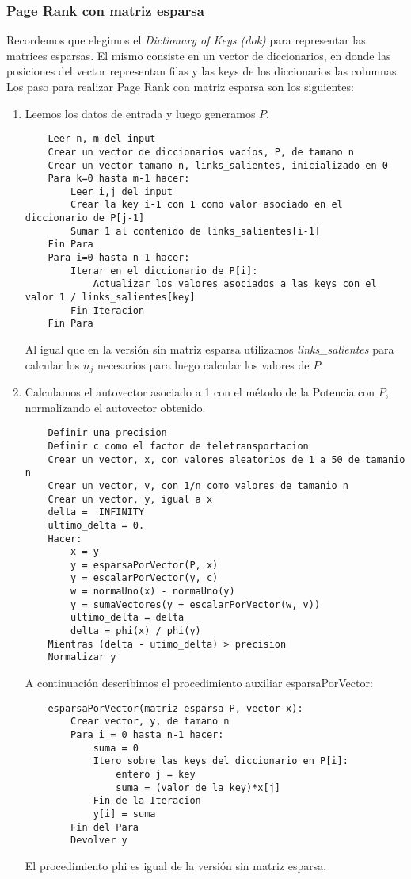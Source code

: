 \subsubsection{Page Rank con matriz esparsa}\label{imp_esparsa}
Recordemos que elegimos el \textit{Dictionary of Keys (dok)} para representar las matrices esparsas. El mismo consiste en un vector de diccionarios, en donde las posiciones del vector representan filas y las keys de los diccionarios las columnas.
Los paso para realizar Page Rank con matriz esparsa son los siguientes:
\begin{enumerate}
	\item Leemos los datos de entrada y luego generamos $P$.
	\begin{lstlisting}
	Leer n, m del input
	Crear un vector de diccionarios vacíos, P, de tamano n
	Crear un vector tamano n, links_salientes, inicializado en 0
	Para k=0 hasta m-1 hacer:
		Leer i,j del input
		Crear la key i-1 con 1 como valor asociado en el diccionario de P[j-1]
		Sumar 1 al contenido de links_salientes[i-1]
	Fin Para
	Para i=0 hasta n-1 hacer:
		Iterar en el diccionario de P[i]:
			Actualizar los valores asociados a las keys con el valor 1 / links_salientes[key]
		Fin Iteracion
	Fin Para
	\end{lstlisting}
	Al igual que en la versión sin matriz esparsa utilizamos \textit{links_salientes} para calcular los $n_j$ necesarios para luego calcular los valores de $P$.

	\item Calculamos el autovector asociado a 1 con el método de la Potencia con $P$, normalizando el autovector obtenido.
	\begin{lstlisting}
	Definir una precision
	Definir c como el factor de teletransportacion
	Crear un vector, x, con valores aleatorios de 1 a 50 de tamanio n
	Crear un vector, v, con 1/n como valores de tamanio n
	Crear un vector, y, igual a x
	delta =  INFINITY
	ultimo_delta = 0.
	Hacer:
		x = y
		y = esparsaPorVector(P, x)
		y = escalarPorVector(y, c)
		w = normaUno(x) - normaUno(y)
		y = sumaVectores(y + escalarPorVector(w, v))
		ultimo_delta = delta
		delta = phi(x) / phi(y)
	Mientras (delta - utimo_delta) > precision
	Normalizar y
	\end{lstlisting}
	A continuación describimos el procedimiento auxiliar esparsaPorVector:
	\begin{lstlisting}
	esparsaPorVector(matriz esparsa P, vector x):
		Crear vector, y, de tamano n
		Para i = 0 hasta n-1 hacer:
			suma = 0
			Itero sobre las keys del diccionario en P[i]:
				entero j = key
				suma = (valor de la key)*x[j]
			Fin de la Iteracion
			y[i] = suma
		Fin del Para
		Devolver y
	\end{lstlisting}
	El procedimiento phi es igual de la versión sin matriz esparsa.


\end{enumerate}
